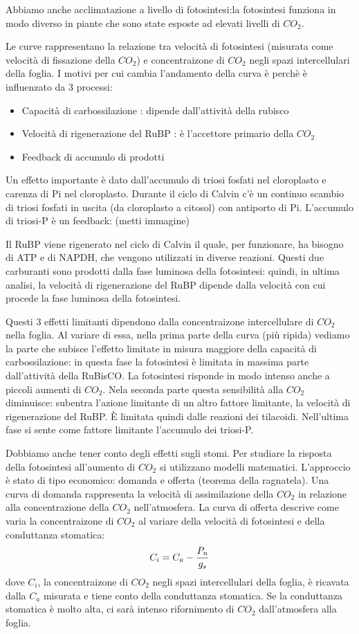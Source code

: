 \documentclass[a4paper,12pt]{book}
\begin{document}
Abbiamo anche acclimatazione a livello di fotosintesi:la fotosintesi funziona in modo diverso in piante che sono state esposte ad elevati livelli di $CO_{2}$.

Le curve rappresentano la relazione tra velocità di fotosintesi (misurata come velocità di fissazione della $CO_{2}$) e concentraizone di $CO_{2}$ negli spazi intercellulari della foglia. I motivi per cui cambia l'andamento della curva è perchè è influenzato da 3 processi:
\begin{itemize}
\item{Capacità di carbossilazione : dipende dall'attività della rubisco}
\item{Velocità di rigenerazione del RuBP : è l'accettore primario della $CO_{2}$ }
\item{Feedback di accumulo di prodotti}
\end{itemize}
Un effetto importante è dato dall'accumulo di triosi fosfati nel cloroplasto e carenza di Pi nel cloroplasto. Durante il ciclo di Calvin c'è un continuo scambio di triosi fosfati in uscita (da cloroplasto a citosol) con antiporto di Pi. L'accumulo di triosi-P è un feedback:
(metti immagine)

Il RuBP viene rigenerato nel ciclo di Calvin il quale, per funzionare, ha bisogno di ATP e di NAPDH, che vengono utilizzati in diverse reazioni. Questi due carburanti sono prodotti dalla fase luminosa della fotosintesi: quindi, in ultima analisi, la velocità di rigenerazione del RuBP dipende dalla velocità con cui procede la fase luminosa della fotosintesi.

Questi 3 effetti limitanti dipendono dalla concentraizone intercellulare di $CO_{2}$  nella foglia. Al variare di essa, nella prima parte della curva (più ripida) vediamo la parte che subisce l'effetto limitate in misura maggiore della capacità di carbossilazione: in questa fase la fotosintesi è limitata in massima parte dall'attività della RuBisCO. La fotosintesi risponde in modo intenso anche a piccoli aumenti di $CO_{2}$. Nela seconda parte questa sensibilità alla $CO_{2}$  diminuisce: subentra l'azione limitante di un altro fattore limitante, la velocità di rigenerazione del RuBP. È limitata quindi dalle reazioni dei tilacoidi. Nell'ultima fase si sente come fattore limitante l'accumulo dei triosi-P.

Dobbiamo anche tener conto degli effetti sugli stomi. Per studiare la risposta della fotosintesi all'aumento di $CO_{2}$ si utilizzano modelli matematici. L'approccio è stato di tipo economico: domanda e offerta (teorema della ragnatela).
Una curva di domanda rappresenta la velocità di assimilazione della $CO_{2}$ in relazione alla concentrazione della $CO_{2}$ nell'atmosfera. La curva di offerta descrive come varia la concentraizone di $CO_{2}$  al variare della velocità di fotosintesi e della conduttanza stomatica:
\begin{equation}
\centering
C_{i}=C_{a} - \frac{P_n}{g_s}
\end{equation}
dove $C_{i}$, la concentraizone di $CO_{2}$ negli spazi intercellulari della foglia, è ricavata dalla $C_{a}$ misurata e tiene conto della conduttanza stomatica. Se la conduttanza stomatica è molto alta, ci sarà intenso rifornimento di $CO_{2}$  dall'atmosfera alla foglia. 
\end{document}
